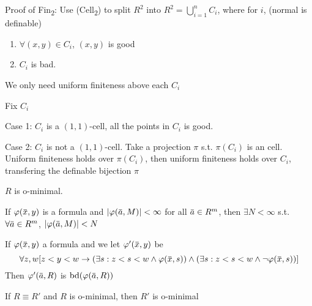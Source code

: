 \documentclass[11pt]{article}
\begin{document}
Proof of Fin\textsubscript{2}: Use (Cell\textsubscript{2}) to split \(R^2\)
into \(R^2=\bigcup_{i=1}^nC_i\), where for \(i\), (normal is definable)
\begin{enumerate}
\item \(\forall(x,y)\in C_i\), \((x,y)\) is good
\item \(C_i\) is bad.
\end{enumerate}
We only need uniform finiteness above each \(C_i\)

Fix \(C_i\)

Case 1: \(C_i\) is a \((1,1)\)-cell, all the points in \(C_i\) is good.

Case 2: \(C_i\) is not a \((1,1)\)-cell. Take a projection \(\pi\) s.t. \(\pi(C_i)\) is an cell.
Uniform finiteness holds over \(\pi(C_i)\), then uniform finiteness holds over \(C_i\), transfering
the definable bijection \(\pi\)

\(R\) is o-minimal.
\begin{lemma}[]
If \(\varphi(\barx,y)\) is a formula and \(\abs{\varphi(\bara,M)}<\infty\) for all \(\bara\in R^m\), then \(\exists N<\infty\)
s.t. \(\forall\bara\in R^m\), \(\abs{\varphi(\bara,M)}<N\)
\end{lemma}

\begin{remark}
If \(\varphi(\barx,y)\) a formula and we let \(\varphi'(\barx,y)\) be
\begin{equation*}
\forall z,w[z<y<w\to(\exists s:z<s<w\wedge\varphi(\barx,s))\wedge(\exists s:z<s<w\wedge\neg\varphi(\barx,s))]
\end{equation*}
Then \(\varphi'(\bara,R)\) is \(\tbd(\varphi(\bara,R))\)
\end{remark}

\begin{theorem}[]
If \(R\equiv R'\) and \(R\) is o-minimal, then \(R'\) is o-minimal
\end{theorem}
\end{document}

